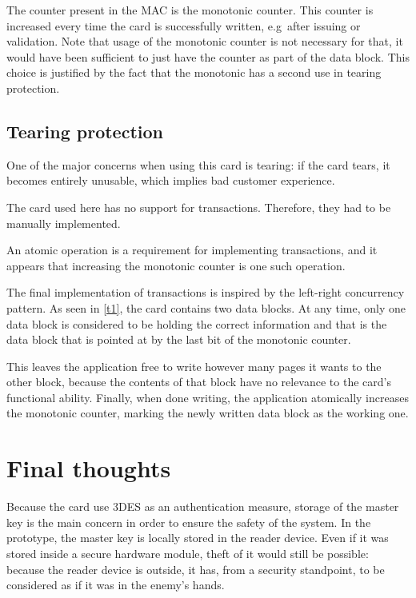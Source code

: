 \documentclass[paper=a4, fontsize=11pt]{scrartcl}
\begin{document}
The counter present in the MAC is the monotonic counter.
This counter is increased every time the card is successfully written, e.g\
after issuing or validation.
Note that usage of the monotonic counter is not necessary for that, it would
have been sufficient to just have the counter as part of the data block.
This choice is justified by the fact that the monotonic has a second use in
tearing protection.

\subsection{Tearing protection}

One of the major concerns when using this card is tearing: if the card tears, it
becomes entirely unusable, which implies bad customer experience.

The card used here has no support for transactions.
Therefore, they had to be manually implemented.

An atomic operation is a requirement for implementing transactions, and it
appears that increasing the monotonic counter is one such operation.

The final implementation of transactions is inspired by the left-right
concurrency pattern.
As seen in \autoref{t1}, the card contains two data blocks.
At any time, only one data block is considered to be holding the correct
information and that is the data block that is pointed at by the last bit of the
monotonic counter.

This leaves the application free to write however many pages it wants to the
other block, because the contents of that block have no relevance to the card's
functional ability.
Finally, when done writing, the application atomically increases the
monotonic counter, marking the newly written data block as the working one.

\section{Final thoughts}

Because the card use 3DES as an authentication measure, storage of the master
key is the main concern in order to ensure the safety of the system.
In the prototype, the master key is locally stored in the reader device.
Even if it was stored inside a secure hardware module, theft of it would still
be possible: because the reader device is outside, it has, from a security
standpoint, to be considered as if it was in the enemy's hands.
\end{document}
